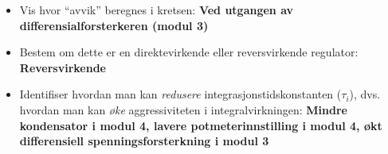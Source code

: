 
\begin{itemize}
\item{} Vis hvor ``avvik'' beregnes i kretsen: {\bf Ved utgangen av differensialforsterkeren (modul 3)}
\item{} Bestem om dette er en direktevirkende eller reversvirkende regulator: {\bf Reversvirkende}
\item{} Identifiser hvordan man kan {\it redusere} integrasjonstidskonstanten ($\tau_i$), dvs. hvordan man kan {\it øke} aggressiviteten i integralvirkningen: {\bf Mindre kondensator i modul 4, lavere potmeterinnstilling i modul 4, økt differensiell spenningsforsterkning i modul 3}
\end{itemize}










